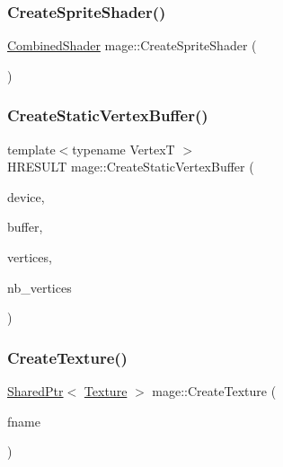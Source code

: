 \hypertarget{namespacemage_af6f5c6ae46131caa77e5361d23d5d7c8}{}\label{namespacemage_af6f5c6ae46131caa77e5361d23d5d7c8} 
\subsubsection{\texorpdfstring{Create\+Sprite\+Shader()}{CreateSpriteShader()}}
{\footnotesize\ttfamily \hyperlink{structmage_1_1_combined_shader}{Combined\+Shader} mage\+::\+Create\+Sprite\+Shader (\begin{DoxyParamCaption}{ }\end{DoxyParamCaption})}

\hypertarget{namespacemage_a7cf0754e3bc2681bc1990e64f4155032}{}\label{namespacemage_a7cf0754e3bc2681bc1990e64f4155032} 
\subsubsection{\texorpdfstring{Create\+Static\+Vertex\+Buffer()}{CreateStaticVertexBuffer()}}
{\footnotesize\ttfamily template$<$typename VertexT $>$ \\
H\+R\+E\+S\+U\+LT mage\+::\+Create\+Static\+Vertex\+Buffer (\begin{DoxyParamCaption}\item[{I\+D3\+D11\+Device2 $\ast$}]{device,  }\item[{I\+D3\+D11\+Buffer $\ast$$\ast$}]{buffer,  }\item[{const VertexT $\ast$}]{vertices,  }\item[{size\+\_\+t}]{nb\+\_\+vertices }\end{DoxyParamCaption})}

\hypertarget{namespacemage_ac27913e621bde0fd01312183aafaaca0}{}\label{namespacemage_ac27913e621bde0fd01312183aafaaca0} 
\subsubsection{\texorpdfstring{Create\+Texture()}{CreateTexture()}}
{\footnotesize\ttfamily \hyperlink{namespacemage_a1e01ae66713838a7a67d30e44c67703e}{Shared\+Ptr}$<$ \hyperlink{classmage_1_1_texture}{Texture} $>$ mage\+::\+Create\+Texture (\begin{DoxyParamCaption}\item[{const wstring \&}]{fname }\end{DoxyParamCaption})}

